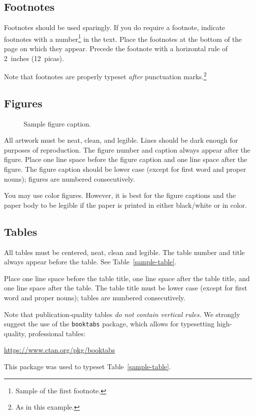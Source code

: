 \documentclass{article}
\begin{document}
\subsection{Footnotes}

Footnotes should be used sparingly.  If you do require a footnote,
indicate footnotes with a number\footnote{Sample of the first
  footnote.} in the text. Place the footnotes at the bottom of the
page on which they appear.  Precede the footnote with a horizontal
rule of 2~inches (12~picas).

Note that footnotes are properly typeset \emph{after} punctuation
marks.\footnote{As in this example.}

\subsection{Figures}

\begin{figure}
  \centering
  \fbox{\rule[-.5cm]{0cm}{4cm} \rule[-.5cm]{4cm}{0cm}}
  \caption{Sample figure caption.}
\end{figure}

All artwork must be neat, clean, and legible. Lines should be dark
enough for purposes of reproduction. The figure number and caption
always appear after the figure. Place one line space before the figure
caption and one line space after the figure. The figure caption should
be lower case (except for first word and proper nouns); figures are
numbered consecutively.

You may use color figures.  However, it is best for the figure
captions and the paper body to be legible if the paper is printed in
either black/white or in color.

\subsection{Tables}

All tables must be centered, neat, clean and legible.  The table
number and title always appear before the table.  See
Table~\ref{sample-table}.

Place one line space before the table title, one line space after the
table title, and one line space after the table. The table title must
be lower case (except for first word and proper nouns); tables are
numbered consecutively.

Note that publication-quality tables \emph{do not contain vertical
  rules.} We strongly suggest the use of the \verb+booktabs+ package,
which allows for typesetting high-quality, professional tables:
\begin{center}
  \url{https://www.ctan.org/pkg/booktabs}
\end{center}
This package was used to typeset Table~\ref{sample-table}.
\end{document}
